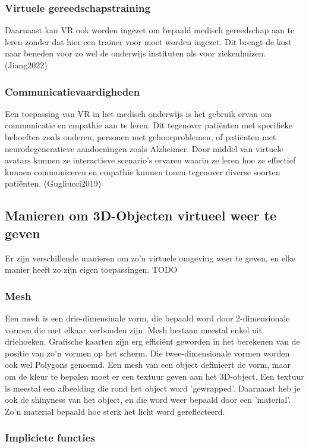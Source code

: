 \subsubsection{Virtuele gereedschapstraining}	
Daarnaast kan VR ook worden ingezet om bepaald medisch gereedschap aan te leren zonder dat hier een trainer voor moet worden ingezet. Dit brengt de kost naar beneden voor zo wel de onderwijs instituten als voor ziekenhuizen. (Jiang2022)

\subsubsection{Communicatievaardigheden}
Een toepassing van VR in het medisch onderwijs is het gebruik ervan om communicatie en empathie aan te leren. Dit tegenover patiënten met specifieke behoeften zoals ouderen, personen met gehoorproblemen, of patiënten met neurodegeneratieve aandoeningen zoals Alzheimer. Door middel van virtuele avatars kunnen ze interactieve scenario's ervaren waarin ze leren hoe ze effectief kunnen communiceren en empathie kunnen tonen tegenover diverse soorten patiënten. (Gugliucci2019)

\subsection{Manieren om 3D-Objecten virtueel weer te geven}

Er zijn verschillende manieren om zo’n virtuele omgeving weer te geven, en elke manier heeft zo zijn eigen toepassingen.  TODO

\subsubsection{Mesh}

Een mesh is een drie-dimensinale vorm, die bepaald word door 2-dimensionale vormen die met elkaar verbonden zijn. Mesh bestaan meestal enkel uit driehoeken. Grafische kaarten zijn erg efficiënt geworden in het berekenen van de positie van zo'n vormen op het scherm. Die twee-dimensionale vormen worden ook wel Polygons genoemd.  \autocite{Luebke2002} 
Een mesh van een object definieert de vorm, maar om de kleur te bepalen moet er een textuur geven aan het 3D-object. Een textuur is meestal een afbeelding die rond het object word 'gewrapped'.
Daarnaast heb je ook de shinyness van het object, en die word weer bepaald door een 'material'. Zo'n material bepaald hoe sterk het licht word gereflecteerd. 

\subsubsection{Impliciete functies}

